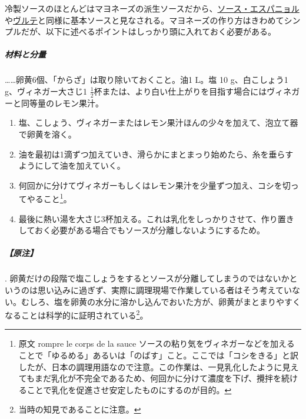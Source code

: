 \begin{recette}


冷製ソースのほとんどはマヨネーズの派生ソースだから、\protect\hyperlink{sauce-espagnole}{ソース・エスパニョル}や\protect\hyperlink{veloute}{ヴルテ}と同様に基本ソースと見なされる。マヨネーズの作り方はきわめてシンプルだが、以下に述べるポイントはしっかり頭に入れておく必要がある。

\hypertarget{proportions-mayonnaise}{%
\subparagraph{材料と分量}\label{proportions-mayonnaise}}

\ldots{}\ldots{}卵黄6個、「からざ」は取り除いておくこと。油1 L。塩 10
g、白こしょう1 g、ヴィネガー大さじ1
\(\frac{1}{2}\)杯または、より白い仕上がりを目指す場合にはヴィネガーと同等量のレモン果汁。

\begin{enumerate}
\def\labelenumi{\arabic{enumi}.}
\item
  塩、こしょう、ヴィネガーまたはレモン果汁ほんの少々を加えて、泡立て器で卵黄を溶く。
\item
  油を最初は1滴ずつ加えていき、滑らかにまとまっり始めたら、糸を垂らすようにして油を加えていく。
\item
  何回かに分けてヴィネガーもしくはレモン果汁を少量ずつ加え、コシを切ってやること\footnote{原文
    rompre le corps de la sauce
    ソースの粘り気をヴィネガーなどを加えることで「ゆるめる」あるいは「のばす」こと。ここでは「コシをきる」と訳したが、日本の調理用語なので注意。この作業は、一見乳化したように見えてもまだ乳化が不完全であるため、何回かに分けて濃度を下げ、攪拌を続けることで乳化を促進させ安定したものにするのが目的。}。
\item
  最後に熱い湯を大さじ3杯加える。これは乳化をしっかりさせて、作り置きしておく必要がある場合でもソースが分離しないようにするため。
\end{enumerate}

\hypertarget{nota-mayonnaise}{%
\subparagraph{【原注】}\label{nota-mayonnaise}}

.
卵黄だけの段階で塩こしょうをするとソースが分離してしまうのではないかというのは思い込みに過ぎず、実際に調理現場で作業している者はそう考えていない。むしろ、塩を卵黄の水分に溶かし込んでおいた方が、卵黄がまとまりやすくなることは科学的に証明されている\footnote{当時の知見であることに注意。}。


\end{recette}
